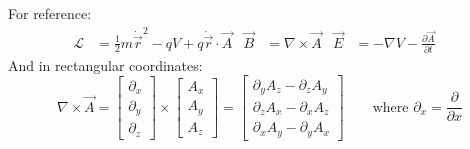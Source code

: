 \documentclass[12pt]{article}
\begin{document}
For reference:
\begin{align*}
    \mathcal{L} &= \tfrac{1}{2} m \dot{\vec{r}}^2 - qV + q \dot{\vec{r}} \cdot \vec{A} &
    \vec{B} &= \nabla \times \vec{A} &
    \vec{E} &= -\nabla V - \frac{\partial \vec{A}}{\partial t} &
\end{align*}
And in rectangular coordinates:
$$
\nabla \times \vec{A} = 
\left[
{\begin{array}{c}
    \partial_x \\
    \partial_y \\
    \partial_z
  \end{array} }
\right]
\times
\left[
{\begin{array}{c}
    A_x \\
    A_y \\
    A_z
  \end{array} }
\right]
=
\left[
{\begin{array}{c}
    \partial_y A_z - \partial_z A_y \\
    \partial_z A_x - \partial_x A_z \\
    \partial_x A_y - \partial_y A_x
\end{array} }
\right]
\quad\quad\text{where $\partial_x=\frac{\partial}{\partial x}$}
$$
\end{document}
